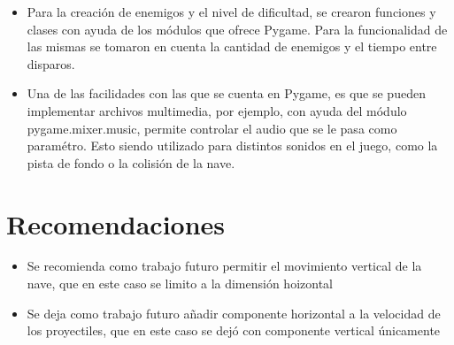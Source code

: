 \documentclass[12pt,letterpaper]{article}
\begin{document}
\begin{itemize}
    \item Para la creación de enemigos y el nivel de dificultad, se crearon funciones y clases con ayuda de los módulos que ofrece Pygame. Para la funcionalidad de las mismas se tomaron en cuenta la cantidad de enemigos y el tiempo entre disparos.
    
    \item Una de las facilidades con las que se cuenta en Pygame, es que se pueden implementar archivos multimedia, por ejemplo, con ayuda del módulo pygame.mixer.music, permite controlar el audio que se le pasa como paramétro. Esto siendo utilizado para distintos sonidos en el juego, como la pista de fondo o la colisión de la nave.
\end{itemize}
\newpage
 
 \section{Recomendaciones}
 \begin{itemize}
     \item Se recomienda como trabajo futuro permitir el movimiento vertical de la nave, que en este caso se limito a la dimensión hoizontal
     \item Se deja como trabajo futuro añadir componente horizontal a la velocidad de los proyectiles, que en este caso se dejó con componente vertical únicamente
 \end{itemize}
 \newpage
\end{document}
